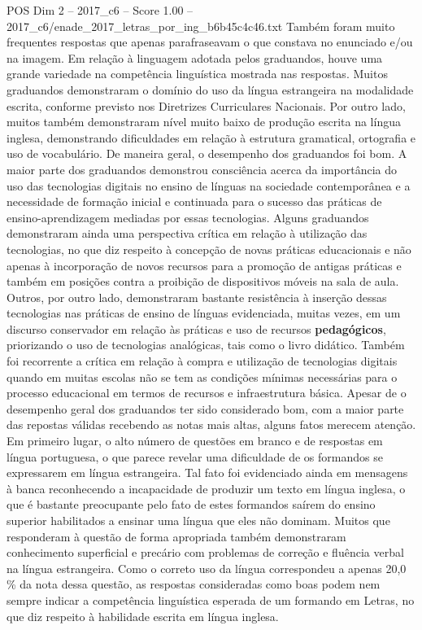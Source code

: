 \begin{textsample}{POS Dim 2 – 2017\_c6 – Score 1.00 – 2017\_c6/enade\_2017\_letras\_por\_ing\_b6b45c4c46.txt}
Também foram muito frequentes respostas que apenas parafraseavam o que constava no enunciado e/ou na imagem.
Em relação à linguagem adotada pelos graduandos, houve uma grande variedade na competência linguística mostrada nas respostas.
Muitos graduandos demonstraram o domínio do uso da língua estrangeira na modalidade escrita, conforme previsto nos Diretrizes Curriculares Nacionais.
Por outro lado, muitos também demonstraram nível muito baixo de produção escrita na língua inglesa, demonstrando dificuldades em relação à estrutura gramatical, ortografia e uso de vocabulário.
De maneira geral, o desempenho dos graduandos foi bom.
A maior parte dos graduandos demonstrou consciência acerca da importância do uso das tecnologias digitais no ensino de línguas na sociedade contemporânea e a necessidade de formação inicial e continuada para o sucesso das práticas de ensino-aprendizagem mediadas por essas tecnologias.
Alguns graduandos demonstraram ainda uma perspectiva crítica em relação à utilização das tecnologias, no que diz respeito à concepção de novas práticas educacionais e não apenas à incorporação de novos recursos para a promoção de antigas práticas e também em posições contra a proibição de dispositivos móveis na sala de aula.
Outros, por outro lado, demonstraram bastante resistência à inserção dessas tecnologias nas práticas de ensino de línguas evidenciada, muitas vezes, em um discurso conservador em relação às práticas e uso de recursos \textbf{pedagógicos}, priorizando o uso de tecnologias analógicas, tais como o livro didático.
Também foi recorrente a crítica em relação à compra e utilização de tecnologias digitais quando em muitas escolas não se tem as condições mínimas necessárias para o processo educacional em termos de recursos e infraestrutura básica.
Apesar de o desempenho geral dos graduandos ter sido considerado bom, com a maior parte das repostas válidas recebendo as notas mais altas, alguns fatos merecem atenção.
Em primeiro lugar, o alto número de questões em branco e de respostas em língua portuguesa, o que parece revelar uma dificuldade de os formandos se expressarem em língua estrangeira.
Tal fato foi evidenciado ainda em mensagens à banca reconhecendo a incapacidade de produzir um texto em língua inglesa, o que é bastante preocupante pelo fato de estes formandos saírem do ensino superior habilitados a ensinar uma língua que eles não dominam.
Muitos que responderam à questão de forma apropriada também demonstraram conhecimento superficial e precário com problemas de correção e fluência verbal na língua estrangeira.
Como o correto uso da língua correspondeu a apenas 20,0 \% da nota dessa questão, as respostas consideradas como boas podem nem sempre indicar a competência linguística esperada de um formando em Letras, no que diz respeito à habilidade escrita em língua inglesa.

\end{textsample}
